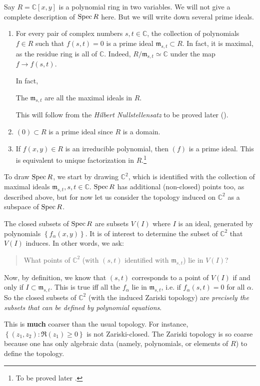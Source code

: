 \begin{example} \label{twovarpoly}
Say $R = \mathbb{C}[x,y]$ is a polynomial ring in two variables.
We will not give a complete description of $\operatorname{Spec} R$ here. But we will write
down several
prime ideals.

\begin{enumerate}
\item For every pair of complex numbers $s,t \in \mathbb{C}$,
the collection of polynomials
$f \in R$ such that $f(s,t) = 0$ is a prime ideal $\mathfrak{m}
_{s,t} \subset R$. In
fact, it is maximal, as the residue ring is all of
$\mathbb{C}$. Indeed,
$R/\mathfrak{m}_{s,t} \simeq \mathbb{C}$ under the map $f \to
f(s,t)$.

In fact, 
\begin{theorem}
The $\mathfrak{m}_{s,t}$ are all the maximal ideals in $R$.
\end{theorem} 
This will follow from the \emph{Hilbert Nullstellensatz} to be
proved later
().
\item $(0) \subset R$ is a prime ideal since $R$ is a domain. 
\item If $f(x,y) \in R$ is an irreducible polynomial, then $(f)$
is a prime
ideal. This is equivalent to unique factorization in
$R$.\footnote{To be
proved later \rref{}.}  
\end{enumerate}

To draw $\operatorname{Spec} R$, we start by drawing $\mathbb{C}^2$, which is identified
with the
collection of
maximal ideals $\mathfrak{m}_{s,t}, s, t \in \mathbb{C}$. $\operatorname{Spec} R$ has additional (non-closed) points
too, as
described above, but for now let us
consider the topology induced on $\mathbb{C}^2$ as a subspace of
$\operatorname{Spec} R$.

The closed subsets of $\operatorname{Spec} R$ are subsets $V(I)$ where $I$ is
an ideal,
generated by polynomials $\left\{f_{\alpha}(x,y)\right\}$. It is of interest to determine the subset of $\mathbb{C}^2$ that
$V(I)$
induces. In other words, we ask:
\begin{quote}
What points of $\mathbb{C}^2$ (with $(s,t)$ identified with
$\mathfrak{m}_{s,t}$) lie in $V(I)$?
\end{quote}
Now, by definition, we know that $(s,t)$ corresponds to a point of $V(I)$ if and
only if $I
\subset \mathfrak{m}_{s,t}$.
This is true iff all the
$f_{\alpha} $ lie in $ \mathfrak{m}_{s,t}$, i.e. if
$f_{\alpha}(s,t) =0$ for all
$\alpha$. So the closed subsets of $\mathbb{C}^2$ (with the
induced Zariski
topology) are \emph{precisely the subsets
that can be defined by polynomial equations}.

This is
\textbf{much} coarser
than the usual topology. For instance, $\left\{(z_1,z_2):
\Re(z_1) \geq 0\right\}$ is
not Zariski-closed. 
The Zariski topology is so coarse because one has only algebraic
data (namely,
polynomials, or elements of $R$) to define the topology.
\end{example} 

